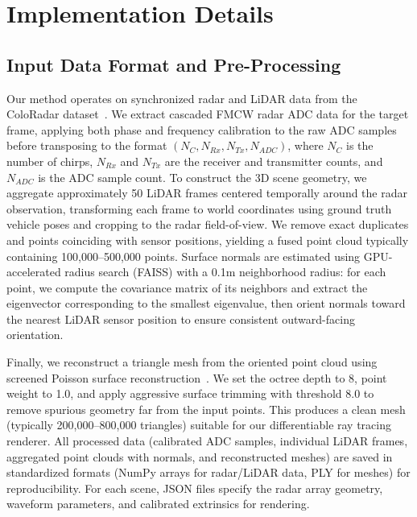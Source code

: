 \section{Implementation Details}
\label{sec:supp_implementation}

\subsection{Input Data Format and Pre-Processing}
\label{sec:supp_preprocessing}

Our method operates on synchronized radar and LiDAR data from the ColoRadar dataset~\cite{kramer2022coloradar}. We extract cascaded FMCW radar ADC data for the target frame, applying both phase and frequency calibration to the raw ADC samples before transposing to the format $(N_C, N_{Rx}, N_{Tx}, N_{ADC})$, where $N_C$ is the number of chirps, $N_{Rx}$ and $N_{Tx}$ are the receiver and transmitter counts, and $N_{ADC}$ is the ADC sample count. To construct the 3D scene geometry, we aggregate approximately 50 LiDAR frames centered temporally around the radar observation, transforming each frame to world coordinates using ground truth vehicle poses and cropping to the radar field-of-view. We remove exact duplicates and points coinciding with sensor positions, yielding a fused point cloud typically containing 100,000--500,000 points. Surface normals are estimated using GPU-accelerated radius search (FAISS) with a 0.1m neighborhood radius: for each point, we compute the covariance matrix of its neighbors and extract the eigenvector corresponding to the
smallest eigenvalue, then orient normals toward the nearest LiDAR sensor position to ensure consistent outward-facing orientation.

Finally, we reconstruct a triangle mesh from the oriented point cloud using screened Poisson surface reconstruction~\cite{kazhdan2006poisson}. We set the octree depth to 8, point weight to 1.0, and apply aggressive surface trimming with threshold 8.0 to remove spurious geometry far from the input points. This produces a clean mesh (typically 200,000--800,000 triangles) suitable for our differentiable ray tracing renderer. All processed data (calibrated ADC samples, individual LiDAR frames, aggregated point clouds with normals, and reconstructed meshes) are saved in standardized formats (NumPy arrays for radar/LiDAR data, PLY for meshes) for reproducibility. For each scene, JSON files specify the radar array geometry, waveform parameters, and calibrated extrinsics for rendering.

